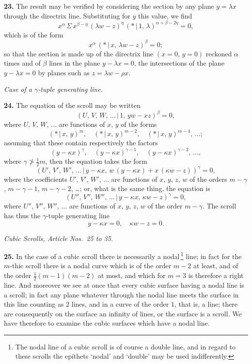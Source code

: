 \documentclass[11pt,a4paper]{article}
\providecommand{\mid}{\,|\,}
\begin{document}
\medskip

\textbf{23.} The result may be verified by considering the section by any plane $y = \lambda x$ through the directrix line. Substituting for $y$ this value, we find
\[
x^{\alpha}\,\Sigma\,x^{\beta - \eta}\,(\lambda w - z)^{\eta}\,(*\mid 1,\,\lambda)^{\alpha + \beta - 2\eta} = 0,
\]
which is of the form
\[
x^{\alpha}\,(*\mid x,\,\lambda w - z)^{\beta} = 0;
\]
so that the section is made up of the directrix line $(x = 0,\,y = 0)$ reckoned $\alpha$ times and of $\beta$ lines in the plane $y - \lambda x = 0$, the intersections of the plane $y - \lambda x = 0$ by planes such as $z = \lambda w - \rho x$.

\medskip

\begin{center}
\textit{Case of a $\gamma$-tuple generating line.}
\end{center}

\textbf{24.} The equation of the scroll may be written
\[
(U,\,V,\,W,\,\ldots\mid 1,\,yw - xz)^{\beta} = 0,
\]
where $U,\,V,\,W,\,\ldots$ are functions of $x,\,y$ of the forms
\[
(*\mid x,\,y)^{m},\quad (*\mid x,\,y)^{m - 2},\quad (*\mid x,\,y)^{m - 4},\,\ldots;
\]
assuming that these contain respectively the factors
\[
(y - \kappa x)^{\gamma},\quad (y - \kappa x)^{\gamma - 1},\quad (y - \kappa x)^{\gamma - 2},\,\ldots,
\]
where $\gamma \not> \tfrac{1}{2}m$, then the equation takes the form
\[
(U',\,V',\,W',\,\ldots\mid y - \kappa x,\,w\,(y - \kappa x) + x\,(\kappa w - z))^{\gamma} = 0,
\]
where the coefficients $U',\,V',\,W',\,\ldots$ are functions of $x,\,y,\,z,\,w$ of the orders $m - \gamma$, $m - \gamma - 1$, $m - \gamma - 2$, \ldots; or, what is the same thing, the equation is
\[
(U'',\,V'',\,W'',\,\ldots\mid y - \kappa x,\,\kappa w - z)^{\gamma} = 0,
\]
where $U'',\,V'',\,W'',\,\ldots$ are functions of $x,\,y,\,z,\,w$ of the order $m - \gamma$. The scroll has thus the $\gamma$-tuple generating line
\[
y - \kappa x = 0,\quad \kappa w - z = 0.
\]

\bigskip

\begin{center}
\textit{Cubic Scrolls, Article Nos.\ 25 to 35.}
\end{center}

\textbf{25.} In the case of a cubic scroll there is necessarily a nodal\,\footnote{The nodal line of a cubic scroll is of course a double line, and in regard to these scrolls the epithets `nodal' and `double' may be used indifferently.} line; in fact for the $m$-thic scroll there is a nodal curve which is of the order $m - 2$ at least, and of the order $\tfrac{1}{2}(m - 1)(m - 2)$ at most, and which for $m = 3$ is therefore a right line. And moreover we see at once that every cubic surface having a nodal line is a scroll; in fact any plane whatever through the nodal line meets the surface in this line counting as $2$ lines, and in a curve of the order $1$, that is, a line; there are consequently on the surface an infinity of lines, or the surface is a scroll. We have therefore to examine the cubic surfaces which have a nodal line.
\end{document}
